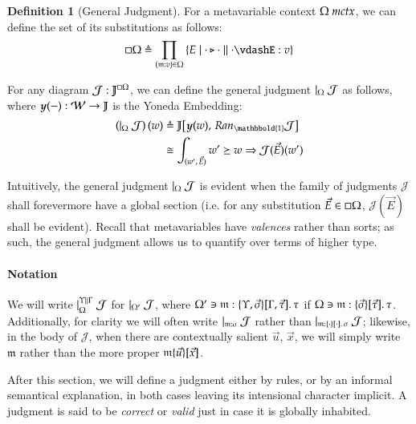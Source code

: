 \documentclass[11pt]{article}
\theoremstyle{definition}
\newtheorem{definition}[thm]{Definition}
\theoremstyle{remark}
\numberwithin{equation}{section}
\def\IModeColorName{MidnightBlue}
\def\OModeColorName{Maroon}
\def\IModeColorName{Black}
\def\OModeColorName{Black}
\newcommand\IMode[1]{{\color{\IModeColorName}{#1}}}
\newcommand\OMode[1]{{\color{\OModeColorName}{#1}}}
\newcommand\GenJ[2]{\vert_{\IMode{#1}}\; #2}
\newcommand\HPGenJ[4]{\vert^{\IMode{#1}\parallel\IMode{#2}}_{\IMode{#3}}\; #4}
\newcommand\MkSet[1]{\left\{#1\right\}}
\newcommand\Member[2]{\IMode{#1}\in\IMode{#2}}
\newcommand\Of[2]{\IMode{#1}: \IMode{#2}}
\newcommand\MkValence[3]{%
  \ifthenelse{\equal{#1}{}}{}{%
    \{#1\}%
  }%
  \ifthenelse{\equal{#2}{}}{}{%
    [#2]%
  }.\, #3%
}
\newcommand\IsMetaCtx[1]{\IMode{#1}\ \textit{mctx}}
\newcommand\Lookup[3]{\IMode{#1}\ni\IMode{#2}:\OMode{#3}}
\newcommand\IsAbtUnmoded[5]{
  #1\triangleright%
  #2\parallel%
  #3\vdash%
  #4:\OMode{#5}%
}
\newcommand\MV[1]{\mathfrak{#1}}
\newcommand\MApp[3]{%
  #1
  \ifthenelse{\equal{#2}{}}{}{%
    \{#2\}%
  }%
  \ifthenelse{\equal{#3}{}}{}{%
    [#3]%
  }
}
\newcommand\Hom[3]{#1\!\left[#2,\,#3\right]\!}
\newcommand\Define[2]{\IMode{#1}\triangleq\OMode{#2}}
\newcommand\ADefine[2]{\IMode{#1}&\triangleq\OMode{#2}}
\newcommand\Yoneda[1]{\boldsymbol{y} (#1)}
\begin{document}
\begin{definition}[General Judgment]
  For a metavariable context $\IsMetaCtx{\Omega}$, we can define the set
  of its substitutions as follows:
  \[
    \Define{{\square\Omega}}{
      \prod_{(\MV{m}:v)\in\Omega}
        \MkSet{E\mid\IsAbtUnmoded{\cdot}{\cdot}{\cdot}{E}{v}}
    }
  \]

  For any diagram $\Of{\mathcal{J}}{\mathbb{J}^{\square\Omega}}$, we can define
  the general judgment $\GenJ{\Omega}{\mathcal{J}}$ as follows, where
  $\Of{\Yoneda{-}}{\mathcal{W}\to\mathbb{J}}$ is the Yoneda Embedding:
  \begin{align*}
    \ADefine{
      \left(\GenJ{\Omega}{\mathcal{J}}\right)(w)
    }{
      \Hom{\mathbb{J}}{
        \Yoneda{w}
      }{
        Ran_{\mathbbold{1}}{\mathcal{J}}
      }
    }\\
    &\cong
    \OMode{
      \int_{(w',\,\vec{E})}{{w'}\succeq{w}\Rightarrow{\mathcal{J}(\vec{E})(w')}}
    }
  \end{align*}

   Intuitively, the general judgment $\GenJ{\Omega}{\mathcal{J}}$ is evident
   when the family of judgments $\mathcal{J}$ shall forevermore have a global
   section (i.e. for any substitution $\Member{\vec{E}}{\square\Omega}$,
   $\mathcal{J}(\vec{E})$ shall be evident). Recall that metavariables have
   \emph{valences} rather than sorts; as such, the general judgment allows us
   to quantify over terms of higher type.

   \paragraph{Notation}

   We will write $\HPGenJ{\Upsilon}{\Gamma}{\Omega}{\mathcal{J}}$ for
   $\GenJ{\Omega'}{\mathcal{J}}$, where
   $\Lookup{\Omega'}{\MV{m}}{\MkValence{\Upsilon,\vec{\sigma}}{\Gamma,\vec{\tau}}{\tau}}$
   if $\Lookup{\Omega}{\MV{m}}{\MkValence{\vec{\sigma}}{\vec{\tau}}{\tau}}$.
   Additionally, for clarity we will often write
   $\GenJ{\MV{m}:\sigma}{\mathcal{J}}$ rather than
   $\GenJ{\MV{m}:\MkValence{\cdot}{\cdot}{\sigma}}{\mathcal{J}}$; likewise, in
   the body of $\mathcal{J}$, when there are contextually salient
   $\vec{u}$, $\vec{x}$, we will simply write $\MV{m}$ rather than the more proper
   $\MApp{\MV{m}}{\vec{u}}{\vec{x}}$.

\end{definition}


After this section, we will define a judgment either by rules, or by an
informal semantical explanation, in both cases leaving its intensional
character implicit. A judgment is said to be \emph{correct} or \emph{valid}
just in case it is globally inhabited.
\end{document}
